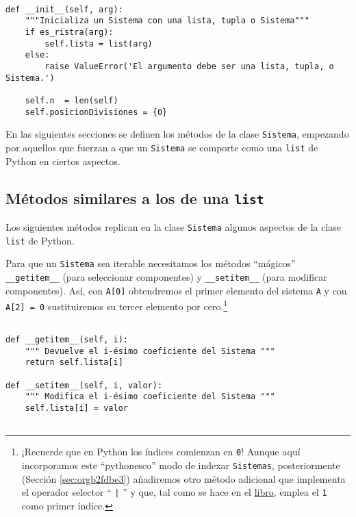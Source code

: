 \documentclass[11pt]{report}
\begin{document}
\begin{verbatim}

def __init__(self, arg):
    """Inicializa un Sistema con una lista, tupla o Sistema"""                        
    if es_ristra(arg):
        self.lista = list(arg)                        
    else:
        raise ValueError('El argumento debe ser una lista, tupla, o Sistema.')

    self.n  = len(self)
    self.posicionDivisiones = {0}

\end{verbatim}

En las siguientes secciones se definen los métodos de la clase
\texttt{Sistema}, empezando por aquellos que fuerzan a que un \texttt{Sistema} se
comporte como una \texttt{list} de Python en ciertos aspectos.

\medskip

\subsection{Métodos similares a los de una \texttt{list}}
\label{sec:orgdf940fd}
       Los siguientes métodos replican en la clase \texttt{Sistema} algunos aspectos
de la clase \texttt{list} de Python.

Para que un \texttt{Sistema} sea iterable necesitamos los métodos
``mágicos'' \texttt{\_\_getitem\_\_} (para seleccionar componentes) y
\texttt{\_\_setitem\_\_} (para modificar componentes).  Así, con \texttt{A[0]}
obtendremos el primer elemento del sistema \texttt{A} y con \texttt{A[2] = 0}
sustituiremos su tercer elemento por cero.\footnote{¡Recuerde que en
Python los índices comienzan en \texttt{0}!  Aunque aquí incorporamos este
``pythonesco'' modo de indexar \texttt{Sistemas}, posteriormente (Sección
\ref{sec:orgb2fdbe3}) añadiremos otro método adicional que implementa el operador
selector `` \texttt{|} '' y que, tal como se hace en el \href{https://mbujosab.github.io/CursoDeAlgebraLineal/libro.pdf\#chapter.1}{libro}, emplea el \texttt{1}
como primer índice.}

\begin{verbatim}

def __getitem__(self, i):
    """ Devuelve el i-ésimo coeficiente del Sistema """
    return self.lista[i]

def __setitem__(self, i, valor):
    """ Modifica el i-ésimo coeficiente del Sistema """
    self.lista[i] = valor
        
\end{verbatim}
\end{document}

